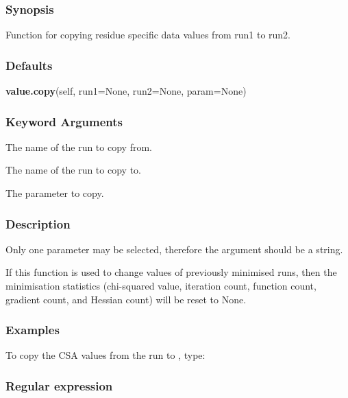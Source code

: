 \subsubsection{Synopsis}

Function for copying residue specific data values from run1 to run2.



\subsubsection{Defaults}

\textsf{\textbf{value.copy}(self, run1=None, run2=None, param=None)}


\subsubsection{Keyword Arguments}

  The name of the run to copy from. 

  The name of the run to copy to. 

  The parameter to copy. 




\subsubsection{Description}

Only one parameter may be selected, therefore the  argument should be a string.


If this function is used to change values of previously minimised runs, then the minimisation statistics (chi-squared value, iteration count, function count, gradient count, and Hessian count) will be reset to None.



\subsubsection{Examples}

To copy the CSA values from the run  to , type:




\subsubsection{Regular expression}

